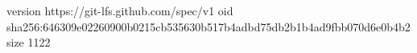 version https://git-lfs.github.com/spec/v1
oid sha256:646309e02260900b0215cb535630b517b4adbd75db2b1b4ad9fbb070d6e0b4b2
size 1122
